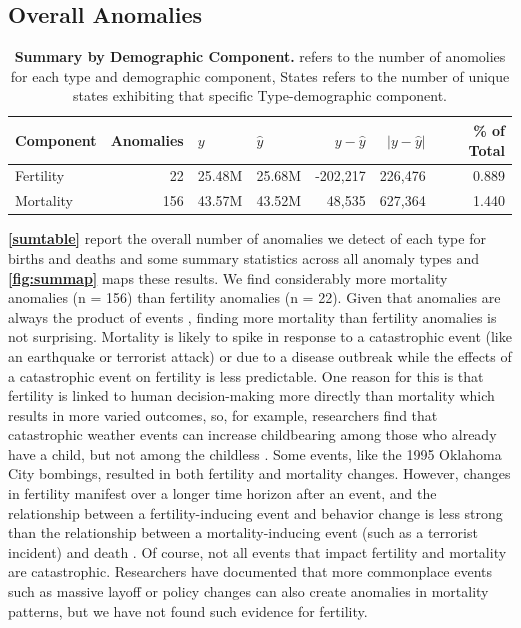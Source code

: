\documentclass[12pt]{article}
\begin{document}
\hypertarget{overall-anomalies}{%
\subsection{Overall Anomalies}\label{overall-anomalies}}

\begin{table}

\caption{\label{tab:unnamed-chunk-2}\textbf{Summary by Demographic Component.}  refers to the number of anomolies for each type and demographic component, States refers to the number of unique states exhibiting that specific Type-demographic component. \label{sumtable}}
\centering
\begin{tabular}[t]{lrllrrr}
\toprule
Component & Anomalies & $y$ & $\hat{y}$ & $y-\hat{y}$ & $|y-\hat{y}|$ & \% of Total\\
\midrule
Fertility & 22 & 25.48M & 25.68M & -202,217 & 226,476 & 0.889\\
Mortality & 156 & 43.57M & 43.52M & 48,535 & 627,364 & 1.440\\
\bottomrule
\end{tabular}
\end{table}

\textbf{\autoref{sumtable}} report the overall number of anomalies we
detect of each type for births and deaths and some summary statistics
across all anomaly types and \textbf{\autoref{fig:summap}} maps these
results. We find considerably more mortality anomalies (n = 156) than
fertility anomalies (n = 22). Given that anomalies are always the
product of events \citep{Song2018ACM}, finding more mortality than
fertility anomalies is not surprising. Mortality is likely to spike in
response to a catastrophic event (like an earthquake or terrorist
attack) or due to a disease outbreak while the effects of a catastrophic
event on fertility is less predictable. One reason for this is that
fertility is linked to human decision-making more directly than
mortality \citep{stein2014couples} which results in more varied
outcomes, so, for example, researchers find that catastrophic weather
events can increase childbearing among those who already have a child,
but not among the childless \citep{Evans2008Hurricanebirth}. Some
events, like the 1995 Oklahoma City bombings, resulted in both fertility
and mortality changes. However, changes in fertility manifest over a
longer time horizon after an event, and the relationship between a
fertility-inducing event and behavior change is less strong than the
relationship between a mortality-inducing event (such as a terrorist
incident) and death \citep{Rodgers2005OKBombing}. Of course, not all
events that impact fertility and mortality are catastrophic. Researchers
have documented that more commonplace events such as massive layoff
\citep{Venkataramani2019} or policy changes
\citep{Livingston2017Cannabis} can also create anomalies in mortality
patterns, but we have not found such evidence for fertility.
\end{document}
